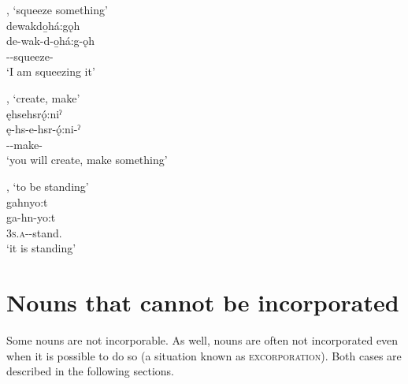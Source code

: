 \ea\label{ex:incverbex12} ,  ‘squeeze something’\\
dewakdo̱há:gǫh\\
\gll de-wak-d-o̱há:g-ǫh\\
 {\dualic}--squeeze-{\stative}\\
\glt `I am squeezing it'
\z


\ea\label{ex:incverbex13} ,  ‘create, make’\\
ęhsehsrǫ́:niˀ\\
\gll ę-hs-e-hsr-ǫ́:ni-ˀ\\
 \fut--make-{\punctual}\\
\glt `you will create, make something'
\z



\ea\label{ex:incverbex14} ,  ‘to be standing’\\
gahnyo:t\\
\gll ga-hn-yo:t\\
 \textsc{3s.a}--stand.{\stative}\\
\glt `it is standing'
\z


\section{Nouns that cannot be incorporated} \label{ch:Nouns that cannot be incorporated}
Some nouns are not incorporable. As well, nouns are often not incorporated even when it is possible to do so (a situation known as \textsc{excorporation}). Both cases are described in the following sections.

